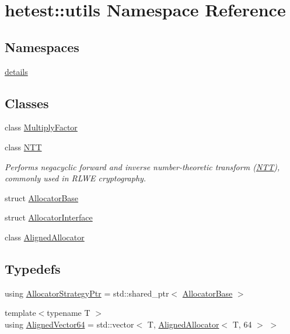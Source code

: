 \hypertarget{namespacehetest_1_1utils}{\section{hetest\-:\-:utils Namespace Reference}
\label{namespacehetest_1_1utils}
}
\subsection*{Namespaces}
\begin{DoxyCompactItemize}
\item 
\hyperlink{namespacehetest_1_1utils_1_1details}{details}
\end{DoxyCompactItemize}
\subsection*{Classes}
\begin{DoxyCompactItemize}
\item 
class \hyperlink{classhetest_1_1utils_1_1MultiplyFactor}{Multiply\-Factor}
\item 
class \hyperlink{classhetest_1_1utils_1_1NTT}{N\-T\-T}
\begin{DoxyCompactList}\small\item\em Performs negacyclic forward and inverse number-\/theoretic transform (\hyperlink{classhetest_1_1utils_1_1NTT}{N\-T\-T}), commonly used in R\-L\-W\-E cryptography. \end{DoxyCompactList}\item 
struct \hyperlink{structhetest_1_1utils_1_1AllocatorBase}{Allocator\-Base}
\item 
struct \hyperlink{structhetest_1_1utils_1_1AllocatorInterface}{Allocator\-Interface}
\item 
class \hyperlink{classhetest_1_1utils_1_1AlignedAllocator}{Aligned\-Allocator}
\end{DoxyCompactItemize}
\subsection*{Typedefs}
\begin{DoxyCompactItemize}
\item 
using \hyperlink{namespacehetest_1_1utils_a3f7f347b9f62a88014bdcc45f7987846}{Allocator\-Strategy\-Ptr} = std\-::shared\-\_\-ptr$<$ \hyperlink{structhetest_1_1utils_1_1AllocatorBase}{Allocator\-Base} $>$
\item 
{\footnotesize template$<$typename T $>$ }\\using \hyperlink{namespacehetest_1_1utils_ad5b6a78d49dc8f6790f7fd2b10bf3db0}{Aligned\-Vector64} = std\-::vector$<$ T, \hyperlink{classhetest_1_1utils_1_1AlignedAllocator}{Aligned\-Allocator}$<$ T, 64 $>$ $>$
\end{DoxyCompactItemize}
